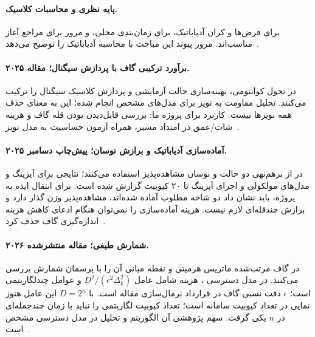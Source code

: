 \paragraph{پایه نظری و محاسبات کلاسیک.}
 برای فرض‌ها و کران آدیاباتیک،
 برای زمان‌بندی محلی،
و مرور  برای  مراجع آغاز مناسب‌اند.
مرور  پیوند این مباحث با محاسبه آدیاباتیک را توضیح می‌دهد~\cite{GapJansen2007,GapRoland2002,GapSchollwock2011,AlbashLidar2018}.

\paragraph{برآورد ترکیبی گاف با پردازش سیگنال؛ مقاله ۲۰۲۵.}
 در 
تحول کوانتومی، بهینه‌سازی حالت آزمایشی و پردازش کلاسیک سیگنال را ترکیب می‌کنند.
تحلیل مقاومت به نویز برای مدل‌های مشخص انجام شده؛ این به معنای حذف همه نویزها نیست.
کاربرد برای پروژه ما: بررسی قابل‌دیدن بودن قله گاف و هزینه شات/عمق در امتداد مسیر، همراه آزمون حساسیت به مدل نویز~\cite{GapLee2025}.

\paragraph{آماده‌سازی آدیاباتیک و برازش نوسان؛ پیش‌چاپ دسامبر ۲۰۲۵.}
 در
از برهم‌نهی دو حالت و نوسان مشاهده‌پذیر استفاده می‌کنند؛ نتایجی برای آیزینگ و مدل‌های مولکولی و اجرای آیزینگ تا ۲۰ کیوبیت گزارش شده است.
برای انتقال ایده به پروژه، باید نشان داد دو شاخه مطلوب آماده شده‌اند، مشاهده‌پذیر وزن گذار دارد و برازش چندقله‌ای لازم نیست.
هزینه آماده‌سازی را نمی‌توان هنگام ادعای کاهش هزینه اندازه‌گیری گاف حذف کرد~\cite{GapCugini2025}.

\paragraph{شمارش طیفی؛ مقاله منتشرشده ۲۰۲۶.}
 در 
گاف مرتب‌شده ماتریس هرمیتی و نقطه میانی آن را با پرسمان شمارش بررسی می‌کنند.
در مدل دسترسی ، هزینه شامل عامل
$D^2/(\epsilon^2\Delta_k^2)$ و عوامل چندلگاریتمی است؛ $\epsilon$ دقت نسبی گاف در قرارداد نرمال‌سازی مقاله است.
با $D=2^n$ این عامل هنوز نمایی در تعداد کیوبیت سامانه است؛ تعداد کیوبیت لگاریتمی را نباید با زمان چندجمله‌ای در $n$ یکی گرفت.
سهم پژوهشی آن الگوریتم و تحلیل در مدل دسترسی مشخص است~\cite{GapCarrera2026}.

